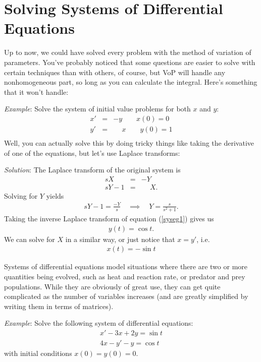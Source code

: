 \documentclass{book}
\begin{document}
\chapter{Solving Systems of Differential Equations}

Up to now, we could have solved every problem with the method of variation
of parameters. You've probably noticed that some questions are easier to
solve with certain techniques than with others, of course, but VoP will handle
any nonhomogeneous part, so long as you can calculate the integral. Here's
something that it won't handle:

\noindent\emph{Example}:
Solve the system of initial value problems for both $x$ and $y$:
\begin{align*}
x' &=& -y \qquad x(0)=0 \\
y' &=& \phantom{-}x \qquad y(0)=1 \\
\end{align*}
Well, you can actually solve this by doing tricky things like taking the
derivative of one of the equations, but let's use Laplace transforms:

\noindent\emph{Solution}: The Laplace transform of the original system is
\begin{align*}
sX &=& -Y \\
sY-1 &=&\phantom{-}X.
\end{align*}
Solving for $Y$ yields
\begin{align}
\label{syseg1}
sY -1 = \frac{-Y}{s} \quad \implies \quad Y = \frac{s}{s^2+1}.
\end{align}
Taking the inverse Laplace transform of equation (\ref{syseg1}) gives us
\begin{align*}
y(t) = \cos t.
\end{align*}
We can solve for $X$ in a similar way, or just notice that $x=y'$, i.e.\
\begin{align*}
x(t) = -\sin t
\end{align*}

Systems of differential equations model situations where there are two or
more quantities being evolved, such as heat and reaction rate, or predator and
prey populations. While they are obviously of great use, they can get
quite complicated as the number of variables increases (and are greatly
simplified by writing them in terms of matrices).


\noindent\emph{Example}: Solve the following system of differential equations:
\begin{align*}
x' - 3x + 2y = \sin t\\
4x -y' - y = \cos t
\end{align*}
with initial conditions $x(0)=y(0)=0$.
\end{document}
